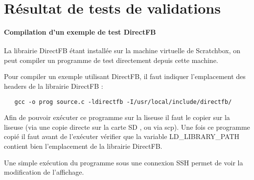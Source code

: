 \chapter{Résultat de tests de validations}


\subsubsection{Compilation d'un exemple de test DirectFB}


La librairie DirectFB étant installée sur la machine virtuelle de Scratchbox, on peut compiler un programme de test directement depuis cette machine.

Pour compiler un exemple utilisant DirectFB, il faut indiquer l'emplacement des headers de la librairie DirectFB : 
\begin{lstlisting}
   gcc -o prog source.c -ldirectfb -I/usr/local/include/directfb/
\end{lstlisting}

Afin de pouvoir exécuter ce programme sur la liseuse il faut le copier sur la liseuse (via une copie directe sur la carte SD , ou via scp).
Une fois ce programme copié il faut avant de l'exécuter vérifier que la variable LD_LIBRARY_PATH contient bien l'emplacement de la librairie DirectFB.

Une simple exécution du programme sous une connexion SSH permet de voir la modification de l'affichage.
